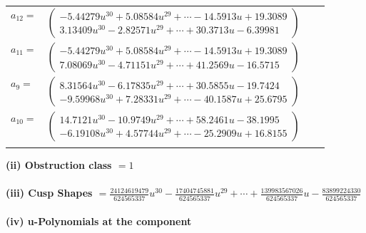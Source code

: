 \documentclass[1p]{elsarticle_modified}
\theoremstyle{definition}
\begin{document}
\begin{tabular}{m{7pt} m{180pt} m{7pt} m{180pt} }
\flushright $a_{12}=$&$\begin{pmatrix}-5.44279 u^{30}+5.08584 u^{29}+\cdots-14.5913 u+19.3089\\3.13409 u^{30}-2.82571 u^{29}+\cdots+30.3713 u-6.39981\end{pmatrix}$ \\
\flushright $a_{11}=$&$\begin{pmatrix}-5.44279 u^{30}+5.08584 u^{29}+\cdots-14.5913 u+19.3089\\7.08069 u^{30}-4.71151 u^{29}+\cdots+41.2569 u-16.5715\end{pmatrix}$ \\
\flushright $a_{9}=$&$\begin{pmatrix}8.31564 u^{30}-6.17835 u^{29}+\cdots+30.5855 u-19.7424\\-9.59968 u^{30}+7.28331 u^{29}+\cdots-40.1587 u+25.6795\end{pmatrix}$ \\
\flushright $a_{10}=$&$\begin{pmatrix}14.7121 u^{30}-10.9749 u^{29}+\cdots+58.2461 u-38.1995\\-6.19108 u^{30}+4.57744 u^{29}+\cdots-25.2909 u+16.8155\end{pmatrix}$\\&\end{tabular}
\flushleft \textbf{(ii) Obstruction class $= 1$}\\~\\
\flushleft \textbf{(iii) Cusp Shapes $= \frac{24124619479}{624565337} u^{30}-\frac{17404745881}{624565337} u^{29}+\cdots+\frac{139983567026}{624565337} u-\frac{83899224330}{624565337}$}\\~\\
\newpage\renewcommand{\arraystretch}{1}
\flushleft \textbf{(iv) u-Polynomials at the component}\newline \\
\end{document}
